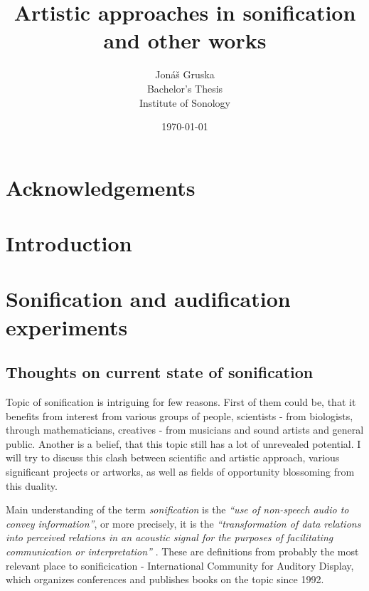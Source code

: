 \documentclass[11pt,a4paper,oneside]{report}
\title{Artistic approaches in sonification\\ and other works}
\author{Jonáš Gruska\\
Bachelor's Thesis\\
Institute of Sonology}
\date{\today}
\begin{document}
\frenchspacing
\raggedbottom
{}       %

\maketitle

\begin{abstract}
\end{abstract}
\clearpage
\setcounter{page}{3}


\chapter*{Acknowledgements}

\tableofcontents

\chapter{Introduction}


\chapter{Sonification and audification experiments}

\section{Thoughts on current state of sonification}


Topic of sonification is intriguing for few reasons. First of them could be, that it benefits from interest from various groups of people, scientists - from biologists, through mathematicians, creatives - from musicians and sound artists and general public. Another is a belief, that this topic still has a lot of unrevealed potential. I will try to discuss this clash between scientific and artistic approach, various significant projects or artworks, as well as fields of opportunity blossoming from this duality.


Main understanding of the term \emph{sonification} is the \emph{``use of non-speech audio to convey information''}, or more precisely, it is the \emph{``transformation of data relations into perceived relations in an acoustic signal for the purposes of facilitating communication or interpretation''} \cite{Fitch}. These are definitions from probably the most relevant place to sonificication - International Community for Auditory Display, which organizes conferences and publishes books on the topic since 1992.
\end{document}
